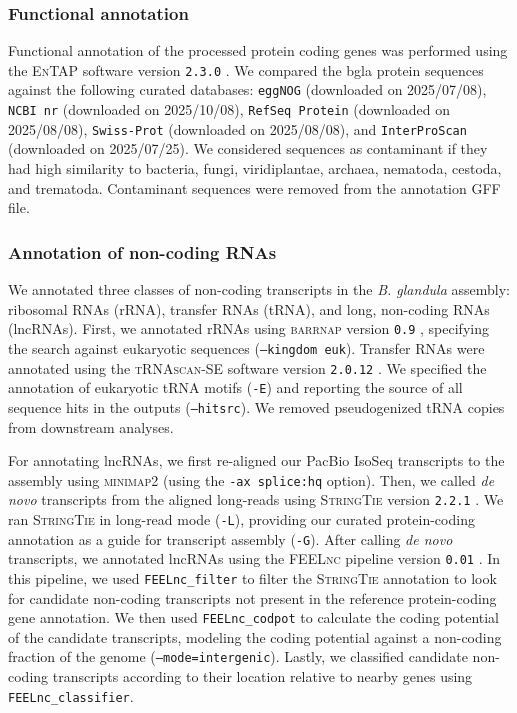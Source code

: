 \documentclass[11pt]{article}
\newcommand{\bgla}{\textit{B. glandula}\xspace}
\begin{document}
\subsubsection*{Functional annotation}

Functional annotation of the processed protein coding genes was performed using the
\textsc{EnTAP} software version \texttt{2.3.0} \citep{hart_span_2020}.
We compared the bgla{} protein sequences against the following curated databases:
\texttt{eggNOG} (downloaded on 2025/07/08), \texttt{NCBI nr} (downloaded on 2025/10/08),
\texttt{RefSeq Protein} (downloaded on 2025/08/08), \texttt{Swiss-Prot}
(downloaded on 2025/08/08), and \texttt{InterProScan} (downloaded on 2025/07/25).
We considered sequences as contaminant if they had high similarity to bacteria, fungi,
viridiplantae, archaea, nematoda, cestoda, and trematoda.
Contaminant sequences were removed from the annotation GFF file.

\subsubsection*{Annotation of non-coding RNAs}\label{sec:methods_ncrna}

We annotated three classes of non-coding transcripts in the \bgla{} assembly: ribosomal
RNAs (rRNA), transfer RNAs (tRNA), and long, non-coding RNAs (lncRNAs). First, we annotated
rRNAs using \textsc{barrnap} version \texttt{0.9} \citep{seemann_barrnap_2018}, specifying
the search against eukaryotic sequences (\texttt{--kingdom euk}). Transfer RNAs were
annotated using the \textsc{tRNAscan-SE} software version \texttt{2.0.12}
\citep{chan_trnascan-se_2021}. We specified the annotation of eukaryotic tRNA motifs
(\texttt{-E}) and reporting the source of all sequence hits in the outputs
(\texttt{--hitsrc}). We removed pseudogenized tRNA copies from downstream analyses.
\vspace{0.2cm}

For annotating lncRNAs, we first re-aligned our PacBio IsoSeq transcripts to the
assembly using \textsc{minimap2} (using the \texttt{-ax splice:hq} option). Then, we
called \textit{de novo} transcripts from the aligned long-reads using \textsc{StringTie}
version \texttt{2.2.1} \citep{shumate_improved_2022,kovaka_transcriptome_2019}. We ran
\textsc{StringTie} in long-read mode (\texttt{-L}), providing our curated protein-coding
annotation as a guide for transcript assembly (\texttt{-G}). After calling \textit{de novo}
transcripts, we annotated lncRNAs using the \textsc{FEELnc} pipeline version \texttt{0.01}
\citep{wucher_feelnc_2017}. In this pipeline, we used \texttt{FEELnc\_filter} to filter
the \textsc{StringTie} annotation to look for candidate non-coding transcripts not
present in the reference protein-coding gene annotation. We then used
\texttt{FEELnc\_codpot} to calculate the coding potential of the candidate transcripts,
modeling the coding potential against a non-coding fraction of the genome
(\texttt{--mode=intergenic}). Lastly, we classified candidate non-coding transcripts
according to their location relative to nearby genes using \texttt{FEELnc\_classifier}.
\vspace{0.2cm}
\end{document}
